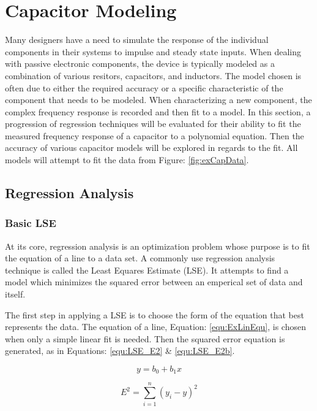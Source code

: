 \section {Capacitor Modeling}

Many designers have a need to simulate the response of the individual components in their systems to impulse and steady state inputs. When dealing with passive electronic components, the device is typically modeled as a combination of various resitors, capacitors, and inductors. The model chosen is often due to either the required accuracy or a specific characteristic of the component that needs to be modeled. When characterizing a new component, the complex frequency response is recorded and then fit to a model. In this section, a progression of regression techniques will be evaluated for their ability to fit the measured frequency response of a capacitor to a polynomial equation. Then the accuracy of various capacitor models will be explored in regards to the fit. All models will attempt to fit the data from Figure: \ref{fig:exCapData}.




\subsection{Regression Analysis}
\label{sec:RegressionAnalysis}
\subsubsection{Basic LSE}
At its core, regression analysis is an optimization problem whose purpose is to fit the equation of a line to a data set. A commonly use regression analysis technique is called the Least Equares Estimate (LSE). It attempts to find a model which minimizes the squared error between an emperical set of data and itself.

The first step in applying a LSE is to choose the form of the equation that best represents the data. The equation of a line, Equation: \eqref{equ:ExLinEqu}, is chosen when only a simple linear fit is needed.
Then the squared error equation is generated, as in Equations: \eqref{equ:LSE_E2} \& \eqref{equ:LSE_E2b}.

\begin{equation}
\label{equ:ExLinEqu}
y = b_0 + b_1 x
\end{equation}

\begin{equation}
\label{equ:LSE_E2}
E^2 = \sum_{i=1}^{n} (y_i - y)^2
\end{equation}

